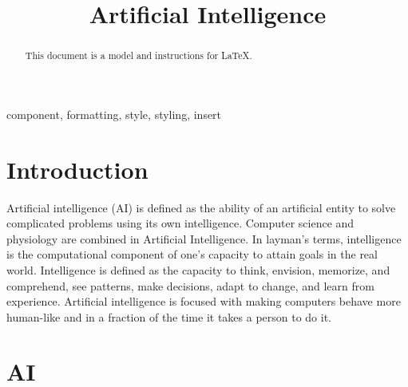 \documentclass[conference]{IEEEtran}
\begin{document}
\title{Artificial Intelligence\\


}

\author{
\and
{}
\and
{}

}

\maketitle

\begin{abstract}
This document is a model and instructions for \LaTeX.

\end{abstract}

\begin{IEEEkeywords}
component, formatting, style, styling, insert
\end{IEEEkeywords}

\section{Introduction}


Artificial intelligence (AI) is defined as the ability of an artificial entity to solve complicated problems using its own intelligence. Computer science and physiology are combined in Artificial Intelligence. In layman's terms, intelligence is the computational component of one's capacity to attain goals in the real world. Intelligence is defined as the capacity to think, envision, memorize, and comprehend, see patterns, make decisions, adapt to change, and learn from experience. Artificial intelligence is focused with making computers behave more human-like and in a fraction of the time it takes a person to do it.
\section{AI}
\end{document}
